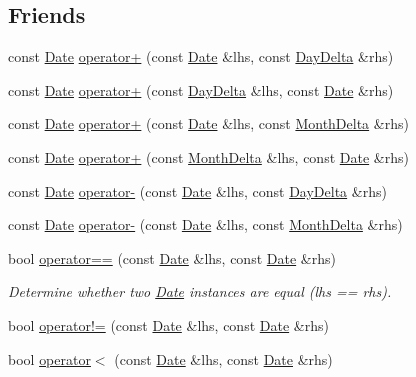 \subsection*{Friends}
\begin{DoxyCompactItemize}
\item 
const \hyperlink{structDate}{Date} \hyperlink{structDate_a88a01e03ad6e96a22ee81ed7a38bdd5a}{operator+} (const \hyperlink{structDate}{Date} \&lhs, const \hyperlink{structDayDelta}{Day\-Delta} \&rhs)
\item 
const \hyperlink{structDate}{Date} \hyperlink{structDate_a064b881a2d6c0460119fee5d230c28e4}{operator+} (const \hyperlink{structDayDelta}{Day\-Delta} \&lhs, const \hyperlink{structDate}{Date} \&rhs)
\item 
const \hyperlink{structDate}{Date} \hyperlink{structDate_a0c895c337e87874cc232482d703db30e}{operator+} (const \hyperlink{structDate}{Date} \&lhs, const \hyperlink{structMonthDelta}{Month\-Delta} \&rhs)
\item 
const \hyperlink{structDate}{Date} \hyperlink{structDate_a7650e3aaeb267ba50ea3b3541e067e35}{operator+} (const \hyperlink{structMonthDelta}{Month\-Delta} \&lhs, const \hyperlink{structDate}{Date} \&rhs)
\item 
const \hyperlink{structDate}{Date} \hyperlink{structDate_a10a73b5010e589b98f3929f9b36e2387}{operator-\/} (const \hyperlink{structDate}{Date} \&lhs, const \hyperlink{structDayDelta}{Day\-Delta} \&rhs)
\item 
const \hyperlink{structDate}{Date} \hyperlink{structDate_a61933f732562f4d15602110136ad536c}{operator-\/} (const \hyperlink{structDate}{Date} \&lhs, const \hyperlink{structMonthDelta}{Month\-Delta} \&rhs)
\item 
bool \hyperlink{structDate_a27425be265a0cc57e4f731825154ec4d}{operator==} (const \hyperlink{structDate}{Date} \&lhs, const \hyperlink{structDate}{Date} \&rhs)
\begin{DoxyCompactList}\small\item\em Determine whether two \hyperlink{structDate}{Date} instances are equal (lhs == rhs). \end{DoxyCompactList}\item 
bool \hyperlink{structDate_ad12683e4457513f4f834e13c4e7f72f8}{operator!=} (const \hyperlink{structDate}{Date} \&lhs, const \hyperlink{structDate}{Date} \&rhs)
\item 
bool \hyperlink{structDate_a611ba98c72bec2ae82bbf086b81563ef}{operator$<$} (const \hyperlink{structDate}{Date} \&lhs, const \hyperlink{structDate}{Date} \&rhs)

\end{DoxyCompactItemize}
